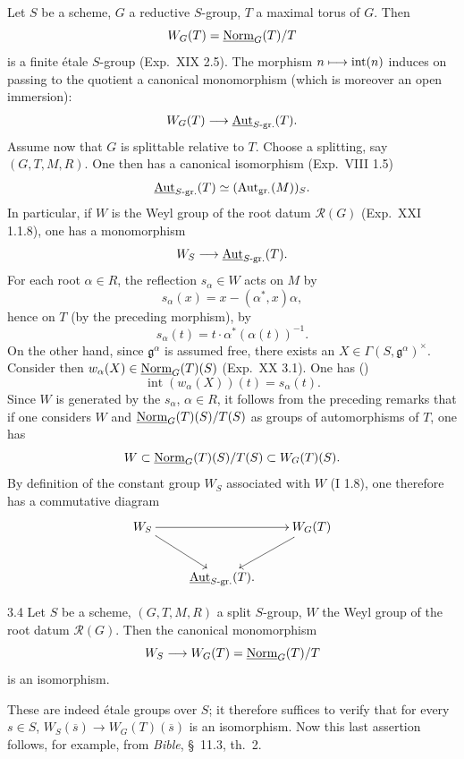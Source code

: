 \label{XXII.sec.3}
\label{XXII.3.1}
Let $S$ be a scheme, $G$ a reductive $S$-group, $T$ a maximal torus of $G$. Then
\[
W_G(T)=\underline{\mathrm{Norm}}_G(T)/T
\]
is a finite \'etale $S$-group (Exp.~XIX 2.5). The morphism $n\longmapsto\operatorname{int}(n)$ induces on passing to the quotient a canonical monomorphism (which is moreover an open immersion):
\[
W_G(T)\longrightarrow\underline{\operatorname{Aut}}_{S\text{-gr.}}(T).
\]
\label{XXII.3.2}
Assume now that $G$ is splittable relative to $T$. Choose a splitting, say $(G,T,M,R)$. One then has a canonical isomorphism (Exp.~VIII 1.5)
\[
\underline{\operatorname{Aut}}_{S\text{-gr.}}(T)\simeq(\operatorname{Aut}_{\mathrm{gr.}}(M))_S.
\]
In particular, if $W$ is the Weyl group of the root datum $\mathscr R(G)$ (Exp.~XXI 1.1.8), one has a monomorphism
\[
W_S\longrightarrow\underline{\operatorname{Aut}}_{S\text{-gr.}}(T).
\]
\label{XXII.3.3}
For each root $\alpha\in R$, the reflection $s_\alpha\in W$ acts on $M$ by
\[
s_\alpha(x)=x-(\alpha^*,x)\alpha,
\]
hence on $T$ (by the preceding morphism), by
\[
s_\alpha(t)=t\cdot\alpha^*(\alpha(t))^{-1}.
\]
On the other hand, since $\mathfrak g^\alpha$ is assumed free, there exists an $X\in\Gamma(S,\mathfrak g^\alpha)^\times$. Consider then $w_\alpha(X)\in\underline{\mathrm{Norm}}_G(T)(S)$ (Exp.~XX 3.1). One has (\loccit)
\[
\operatorname{int}(w_\alpha(X))(t)=s_\alpha(t).
\]
Since $W$ is generated by the $s_\alpha$, $\alpha\in R$, it follows from the preceding remarks that if one considers $W$ and $\underline{\mathrm{Norm}}_G(T)(S)/T(S)$ as groups of automorphisms of $T$, one has
\[
W\subset\underline{\mathrm{Norm}}_G(T)(S)/T(S)\subset W_G(T)(S).
\]
By definition of the constant group $W_S$ associated with $W$ (\cf I 1.8), one therefore has a commutative diagram
\[
\xymatrix{W_S\ar[rr]\ar[dr]&&W_G(T)\ar[dl]\\&\underline{\Aut}_{S\text{-gr.}}(T).&}
\]
\begin{proposition}{3.4}\label{XXII.3.4}
Let $S$ be a scheme, $(G,T,M,R)$ a split $S$-group, $W$ the Weyl group of the root datum $\mathscr R(G)$. Then the canonical monomorphism
\[
W_S\longrightarrow W_G(T)=\underline{\mathrm{Norm}}_G(T)/T
\]
is an isomorphism.
\end{proposition}
These are indeed \'etale groups over $S$; it therefore suffices to verify that for every $s\in S$, $W_S(\overline s)\to W_G(T)(\overline s)$ is an isomorphism.{\renewcommand{\thefootnote}{(6)}} Now this last assertion follows, for example, from \textit{Bible}, \S~11.3, th.~2.
